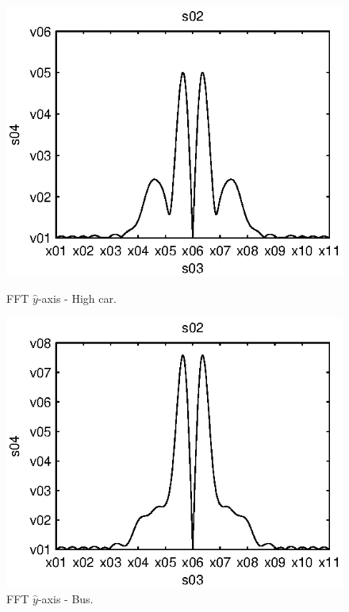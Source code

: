 \begin{subfigures}
\begin{figure}[tfhb]
\begin{minipage}{0.45\linewidth}
 	\centering
 	
	\includegraphics[width=1\linewidth]{images/fft-high_car-y}
  	\caption[FFT $\hat{y}$-axis - High car]{FFT $\hat{y}$-axis - High car.}
  	\label{fig:fft-high_car-y} 
 \end{minipage} \hfill
 \begin{minipage}{0.45\linewidth}
 \centering
 	
	\includegraphics[width=1\linewidth]{images/fft-bus-y}
  	\caption[FFT $\hat{y}$-axis - Bus]{FFT $\hat{y}$-axis - Bus.}
  	\label{fig:fft-bus-y} 
 \end{minipage}
\end{figure}
\end{subfigures}

